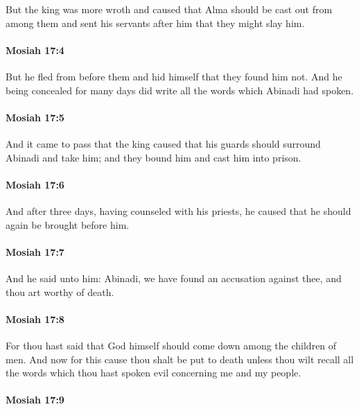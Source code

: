 			But the king was more wroth and caused
			that Alma should be cast out from among them
			and sent his servants after him that they might slay him.

		\paragraph{Mosiah 17:4} %
			\label{MOSIAH-17-4}

			But he fled from before them and hid himself that they found him not.
			And he being concealed for many days
			did write all the words which Abinadi had spoken.

		\paragraph{Mosiah 17:5} %
			\label{MOSIAH-17-5}

			And it came to pass that the king caused
			that his guards should surround Abinadi and take him;
			and they bound him and cast him into prison.

		\paragraph{Mosiah 17:6} %
			\label{MOSIAH-17-6}

			And after three days, having counseled with his priests,
			he caused that he should again be brought before him.

		\paragraph{Mosiah 17:7} %
			\label{MOSIAH-17-7}

			And he said unto him:
			Abinadi, we have found an accusation against thee,
			and thou art worthy of death.

		\paragraph{Mosiah 17:8} %
			\label{MOSIAH-17-8}

			For thou hast said that God himself should come down among the children of men.
			And now for this cause thou shalt be put to death
			unless thou wilt recall all the words
			which thou hast spoken evil concerning me and my people.

		\paragraph{Mosiah 17:9} %
			\label{MOSIAH-17-9}

